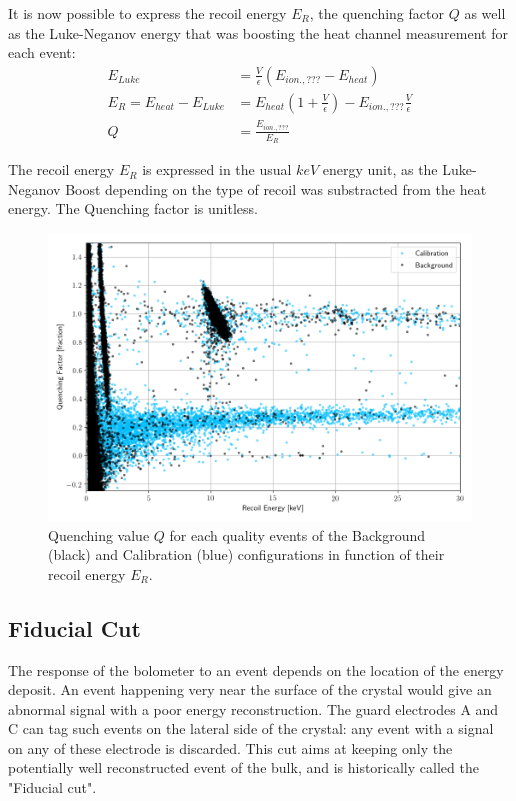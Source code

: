 It is now possible to express the recoil energy $E_R$, the quenching factor $Q$ as well as the Luke-Neganov energy that was boosting the heat channel measurement for each event:
\begin{align}
	E_{Luke} &= \frac{V}{\epsilon} ( E_{ion., ???} - E_{heat} )
	\\
	E_R = E_{heat} - E_{Luke} &= E_{heat} \left( 1 + \frac{V}{\epsilon} \right) - E_{ion., ???} \frac{V}{\epsilon}
	\\
	Q &= \frac{E_{ion., ???}}{E_R}
\end{align}

The recoil energy $E_R$ is expressed in the usual $keV$ energy unit, as the Luke-Neganov Boost depending on the type of recoil was substracted from the heat energy. The Quenching factor is unitless.


\begin{figure}
\centering
\includegraphics[width=\linewidth,]{Figures/Neutron/quenching_plot.png}
\caption{Quenching value $Q$ for each quality events of the Background (black) and Calibration (blue) configurations in function of their recoil energy $E_R$.}
\label{fig:quenching_plot}
\end{figure}


\subsection{Fiducial Cut}

The response of the bolometer to an event depends on the location of the energy deposit. An event happening very near the surface of the crystal would give an abnormal signal with a poor energy reconstruction. The guard electrodes A and C can tag such events on the lateral side of the crystal: any event with a signal on any of these electrode is discarded. This cut aims at keeping only the potentially well reconstructed event of the bulk, and is historically called the "Fiducial cut".
